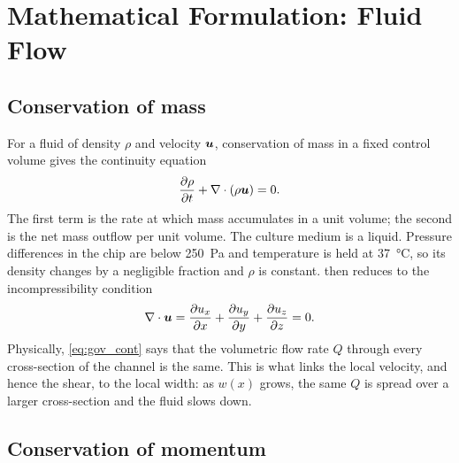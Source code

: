 \chapter{Mathematical Formulation: Fluid Flow}
\label{ch:governing}

\section{Conservation of mass}

For a fluid of density $\rho$ and velocity $\bm{u}$, conservation of mass in a fixed control volume gives the continuity equation
\begin{equation}
\frac{\partial\rho}{\partial t}+\nabla\cdot(\rho\bm{u})=0 .
\label{eq:gov_cont_general}
\end{equation}
The first term is the rate at which mass accumulates in a unit volume; the second is the net mass outflow per unit volume. The culture medium is a liquid. Pressure differences in the chip are below \SI{250}{Pa} and temperature is held at \SI{37}{\celsius}, so its density changes by a negligible fraction and $\rho$ is constant.  then reduces to the incompressibility condition
\begin{equation}
\nabla\cdot\bm{u}=\frac{\partial u_x}{\partial x}+\frac{\partial u_y}{\partial y}+\frac{\partial u_z}{\partial z}=0 .
\label{eq:gov_cont}
\end{equation}
Physically, \cref{eq:gov_cont} says that the volumetric flow rate $Q$ through every cross-section of the channel is the same. This is what links the local velocity, and hence the shear, to the local width: as $w(x)$ grows, the same $Q$ is spread over a larger cross-section and the fluid slows down.

\section{Conservation of momentum}

